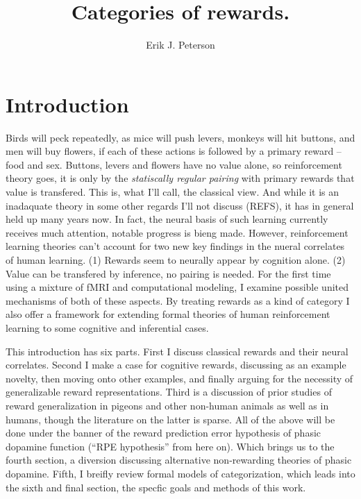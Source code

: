 \documentclass[doc,12pt]{apa}        %
\title{Categories of rewards.}
\author{Erik J. Peterson} \affiliation{Dept. of Psychology \\ Colorado State University \\ Fort Collins, CO}
\begin{document}
 
\maketitle
\doublespacing

\section{Introduction} %
\label{sec:introduction}
Birds will peck repeatedly, as mice will push levers, monkeys will hit buttons, and men will buy flowers, if each of these actions is followed by a primary reward -- food and sex.  Buttons, levers and flowers have no value alone, so reinforcement theory goes, it is only by the \emph{statiscally regular pairing} with primary rewards that value is transfered.  This is, what I'll call, the classical view.  And while it is an inadaquate theory in some other regards I'll not discuss (REFS), it has in general held up many years now.  In fact, the neural basis of such learning currently receives much attention, notable progress is bieng made.  However, reinforcement learning theories can't account for two new key findings in the nueral correlates of human learning. (1) Rewards seem to neurally appear by cognition alone. (2) Value can be transfered by inference, no pairing is needed.  For the first time using a mixture of fMRI and computational modeling, I examine possible united mechanisms of both of these aspects. By treating rewards as a kind of category I also offer a framework for extending formal theories of human reinforcement learning to some cognitive and inferential cases.

This introduction has six parts.  First I discuss classical rewards and their neural correlates.  Second I make a case for cognitive rewards, discussing as an example novelty, then moving onto other examples, and finally arguing for the necessity of generalizable reward representations.  Third is a discussion of prior studies of reward generalization in pigeons and other non-human animals as well as in humans, though the literature on the latter is sparse.   All of the above will be done under the banner of the reward prediction error hypothesis of phasic dopamine function (``RPE hypothesis'' from here on).  Which brings us to the fourth section, a diversion discussing alternative non-rewarding theories of phasic dopamine.  Fifth, I breifly review formal models of categorization, which leads into the sixth and final section, the specfic goals and methods of this work.
\end{document}
